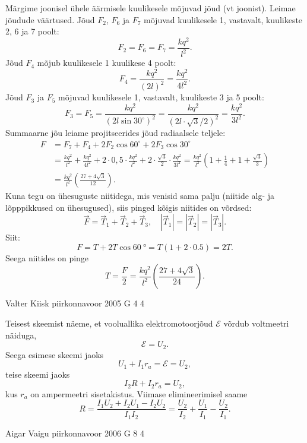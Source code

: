 \documentclass[11pt, twoside]{article}
\begin{document}
{{Märgime joonisel ühele äärmisele kuulikesele mõjuvad jõud (vt joonist). Leimae jõudude väärtused. Jõud $F_2$, $F_6$ ja $F_7$ mõjuvad kuulikesele 1, vastavalt, kuulikeste 2, 6 ja 7 poolt:
\[
F_2 = F_6 = F_7 = \frac{kq^2}{l^2}.
\]
Jõud $F_4$ mõjub kuulikesele 1 kuulikese 4 poolt:
\[
F_{4}=\frac{k q^{2}}{(2 l)^{2}}=\frac{k q^{2}}{4 l^{2}}.
\]
Jõud $F_3$ ja $F_5$ mõjuvad kuulikesele 1, vastavalt, kuulikeste 3 ja 5 poolt:
\[
F_{3}=F_{5}=\frac{k q^{2}}{\left(2 l \sin 30^{\circ}\right)^{2}}=\frac{k q^{2}}{(2 l \cdot \sqrt{3} / 2)^{2}}=\frac{k q^{2}}{3 l^{2}}.
\]
Summaarne jõu leiame projitseerides jõud radiaalsele teljele:
\[
\begin{aligned}
F&=F_{7}+F_{4}+2 F_{2} \cos 60^{\circ}+2 F_{3} \cos 30^{\circ}\\
&=\frac{k q^{2}}{l^{2}}+\frac{k q^{2}}{4 l^{2}}+2 \cdot 0,5 \cdot \frac{k q^{2}}{l^{2}}+2 \cdot \frac{\sqrt{3}}{2} \cdot \frac{k q^{2}}{3 l^{2}}=\frac{k q^{2}}{l^{2}}\left(1+\frac{1}{4}+1+\frac{\sqrt{3}}{3}\right)\\
&=\frac{k q^{2}}{l^{2}}\left(\frac{27+4 \sqrt{3}}{12}\right).
\end{aligned}
\]
Kuna tegu on ühesuguste niitidega, mis venisid sama palju (niitide alg- ja lõpppikkused on ühesugused), siis pinged kõigis niitides on võrdsed: 
\[
\vec{F}=\vec{T}_{1}+\vec{T}_{2}+\vec{T}_{3}, \quad\left|\vec{T}_{1}\right|=\left|\vec{T}_{2}\right|=\left|\vec{T}_{3}\right|.
\]
Siit:
\[
F = T + 2T \cos \SI{60}{\degree} = T (\num{1} + \num{2} \cdot \num{0,5}) = 2T.
\]
Seega niitides on pinge
\[
T=\frac{F}{2}=\frac{k q^{2}}{l^{2}}\left(\frac{27+4 \sqrt{3}}{24}\right).
\]
\fi
}

{Valter Kiisk} %
{piirkonnavoor} %
{2005} %
{G 4} %
{4} %
{

\ifSolution
Teisest skeemist näeme, et vooluallika elektromotoorjõud $\mathcal E$ võrdub voltmeetri näiduga,
\[
\mathcal E = U_2.
\]
Seega esimese skeemi jaoks
\[
U_1 + I_1r_a = \mathcal E = U_2,
\]
teise skeemi jaoks
\[
I_2R + I_2r_a = U_2,
\]
kus $r_a$ on ampermeetri sisetakistus. Viimase elimineerimisel saame
\[
R=\frac{I_{1} U_{2}+I_{2} U_{1}-I_{2} U_{2}}{I_{1} I_{2}}=\frac{U_{2}}{I_{2}}+\frac{U_{1}}{I_{1}}-\frac{U_{2}}{I_{1}}.
\]
\fi
}

{Aigar Vaigu} %
{piirkonnavoor} %
{2006} %
{G 8} %
{4} %
{

}}
\end{document}
